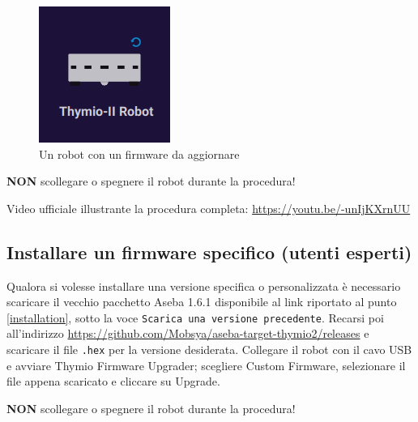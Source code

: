 \documentclass[12pt]{article}
\begin{document}
	\begin{figure}[H]
		\centering
		\includegraphics{img/fwUpgrade.png}
		\caption{Un robot con un firmware da aggiornare}
		\label{fwUpgrade}
	\end{figure}
	
	\textbf{NON} scollegare o spegnere il robot durante la procedura!
	
	Video ufficiale illustrante la procedura completa: \url{https://youtu.be/-unIjKXrnUU}\\
	
	
	\subsection{Installare un firmware specifico (utenti esperti)}
	
	Qualora si volesse installare una versione specifica o personalizzata è necessario scaricare il vecchio pacchetto Aseba 1.6.1 disponibile al link riportato al punto \ref{installation}, sotto la voce \texttt{Scarica una versione precedente}.	
	Recarsi poi all'indirizzo \url{https://github.com/Mobsya/aseba-target-thymio2/releases} e scaricare il file \texttt{.hex} per la versione desiderata. Collegare il robot con il cavo USB e avviare Thymio Firmware Upgrader; scegliere Custom Firmware, selezionare il file appena scaricato e cliccare su Upgrade. 
	
	\textbf{NON} scollegare o spegnere il robot durante la procedura!
	
\end{document}

